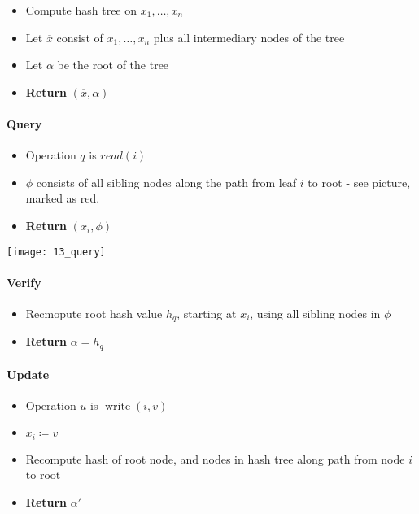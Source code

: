 \begin{itemize}
		\item Compute hash tree on $x_1, \ldots, x_n$
		\item Let $\overline{x}$ consist of $x_1, \ldots, x_n$ plus all
				intermediary nodes of the tree
		\item Let $\alpha$ be the root of the tree
		\item \textbf{Return} $(\overline{x}, \alpha)$
\end{itemize}

\paragraph{Query}

\begin{itemize}
		\item Operation $q$ is $read(i)$
		\item $\phi$ consists of all sibling nodes along the path from leaf $i$
				to root - see picture, marked as red.
		\item \textbf{Return} $(x_i, \phi)$
\end{itemize}

\texttt{[image: 13\_query]}

\paragraph{Verify}

\begin{itemize}
		\item Recmopute root hash value $h_q$, starting at $x_i$, using all
				sibling nodes in $\phi$
		\item \textbf{Return} $\alpha = h_q$
\end{itemize}

\paragraph{Update}

\begin{itemize}
		\item Operation $u$ is $\operatorname{write}(i, v)$
		\item $x_i \coloneqq v$
		\item Recompute hash of root node, and nodes in hash tree along path from node $i$ to root
		\item \textbf{Return} $\alpha'$
\end{itemize}

